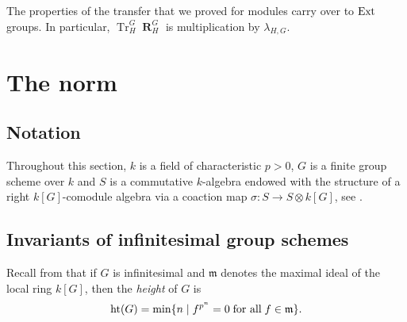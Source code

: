 \documentclass[12pt]{amsart}
\theoremstyle{definition}
\DeclareMathOperator{\res}{\mathbf{R}}
\DeclareMathOperator{\Tr}{Tr}
\begin{document}
The properties of the transfer that we proved for modules carry over to ${\rm Ext}$ groups. In particular, $\Tr^G_H \res^G_H$ is multiplication by $\lambda_{H,G}$.




\section{The norm}\label{sec:norm}
\subsection{Notation}\label{sec:notation}
Throughout this section, $k$ is a field of characteristic $p>0$, $G$ is a finite group scheme over $k$ and $S$ is a commutative $k$-algebra endowed with the structure of a right $k[G]$-comodule algebra via a coaction map $\sigma:S\rightarrow S\otimes k[G]$, see \cite[4.1.2]{MR1243637}. 

\subsection{Invariants of infinitesimal group schemes}\label{sec:norminf}

Recall from \cite[II.7.1.4]{MR0302656} that if $G$ is infinitesimal and $\mathfrak{m}$ denotes the maximal ideal of the local ring $k[G]$, then the {\em height} of $G$ is
\[
{\rm ht}(G)
={\rm min}
\{
n\;|\;f^{p^n}=0\;\text{for all}\;f\in\mathfrak{m}
\}.
\]
\end{document}
